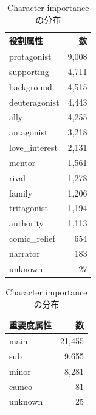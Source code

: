 \documentclass[a4j,12pt,dvipdfmx]{jsreport}
\begin{document}
\begin{table}[htbp]
   \centering
   \begin{minipage}[t]{0.48\linewidth}
      \centering
      \caption{Character role の分布}
      \label{tab:character_role_stats}
      \begin{tabular}{lr}
         \toprule
         \textbf{役割属性}  & \textbf{数} \\
         \midrule
         protagonist    & 9{,}008    \\
         supporting     & 4{,}711    \\
         background     & 4{,}515    \\
         deuteragonist  & 4{,}443    \\
         ally           & 4{,}255    \\
         antagonist     & 3{,}218    \\
         love\_interest & 2{,}131    \\
         mentor         & 1{,}561    \\
         rival          & 1{,}278    \\
         family         & 1{,}206    \\
         tritagonist    & 1{,}194    \\
         authority      & 1{,}113    \\
         comic\_relief  & 654        \\
         narrator       & 183        \\
         unknown        & 27         \\
         \bottomrule
      \end{tabular}
   \end{minipage}
   \hfill
   \begin{minipage}[t]{0.48\linewidth}
      \centering
      \caption{Character importance の分布}
      \label{tab:character_importance_stats}
      \begin{tabular}{lr}
         \toprule
         \textbf{重要度属性} & \textbf{数} \\
         \midrule
         main           & 21{,}455   \\
         sub            & 9{,}655    \\
         minor          & 8{,}281    \\
         cameo          & 81         \\
         unknown        & 25         \\
         \bottomrule
      \end{tabular}
   \end{minipage}
\end{table}
\end{document}
